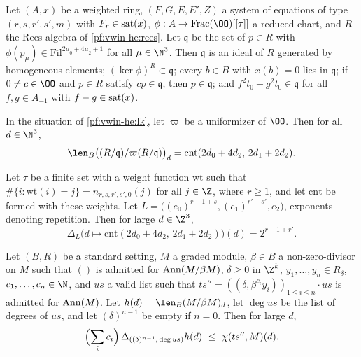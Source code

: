\begin{lemma}\label{pf:vwin-he:lk}
Let $(A,x)$ be a weighted ring, $(F,G,E,E',Z)$ a system of equations of type $(r,s,r',s',m)$ with
$F_r\in\operatorname{sat}(x)$, $\phi:A\to\mathrm{Frac}(\OO)[[\tau]]$ a reduced chart, and $R$ the Rees algebra of
\cref{pf:vwin-he:rees}. Let $\mathfrak q$ be the set of $p\in R$ with $\phi(p_\mu)\in\mathrm{Fil}^{2\mu_0+4\mu_2+1}$
for all $\mu\in\N^3$. Then $\mathfrak q$ is an ideal of $R$ generated by homogeneous elements;
$(\ker\phi)^R\subset\mathfrak q$; every $b\in B$ with $x(b)=0$ lies in $\mathfrak q$; if $0\ne c\in\OO$ and $p\in R$
satisfy $cp\in\mathfrak q$, then $p\in\mathfrak q$; and $f^2t_0-g^2t_0\in\mathfrak q$ for all $f,g\in A_{-1}$ with
$f-g\in\operatorname{sat}(x)$.
\end{lemma}

\begin{lemma}\label{pf:vwin-he:hf}
In the situation of \cref{pf:vwin-he:lk}, let $\varpi$ be a uniformizer of $\OO$. Then for all $d\in\N^3$,
\[
 \len_B\bigl((R/\mathfrak q)/\varpi(R/\mathfrak q)\bigr)_d=\mathrm{cnt}(2d_0+4d_2,\,2d_1+2d_2).
\]
\end{lemma}

\begin{lemma}\label{pf:vwin-he:num}
Let $\tau$ be a finite set with a weight function $\mathrm{wt}$ such that $\#\{i:\mathrm{wt}(i)=j\}=n_{r,s,r',s',0}(j)$
for all $j\in\Z$, where $r\ge1$, and let $\mathrm{cnt}$ be formed with these weights. Let
$L=\bigl((e_0)^{r-1+s},(e_1)^{r'+s'},e_2\bigr)$, exponents denoting repetition. Then for large $d\in\Z^3$,
\[
 \Delta_L\bigl(d\mapsto\mathrm{cnt}(2d_0+4d_2,\,2d_1+2d_2)\bigr)(d)=2^{r-1+r'}.
\]
\end{lemma}

\begin{lemma}\label{pf:vwin-he:la}
Let $(B,R)$ be a standard setting, $M$ a graded module, $\beta\in B$ a non-zero-divisor on $M$ such that $()$ is
admitted for $\operatorname{Ann}(M/\beta M)$, $\delta\ge0$ in $\Z^k$, $y_1,\dots,y_n\in R_\delta$, $c_1,\dots,c_n\in\N$, and
$us$ a valid list such that $ts''=((\delta,\beta^{c_i}y_i))_{1\le i\le n}\cdot us$ is admitted for $\operatorname{Ann}(M)$.
Let $h(d)=\len_B(M/\beta M)_d$, let $\deg us$ be the list of degrees of $us$, and let $(\delta)^{n-1}$ be empty if
$n=0$. Then for large $d$,
\[
 \Bigl(\sum_ic_i\Bigr)\,\Delta_{((\delta)^{n-1},\,\deg us)}h(d)\ \le\ \chi(ts'',M)(d).
\]
\end{lemma}

